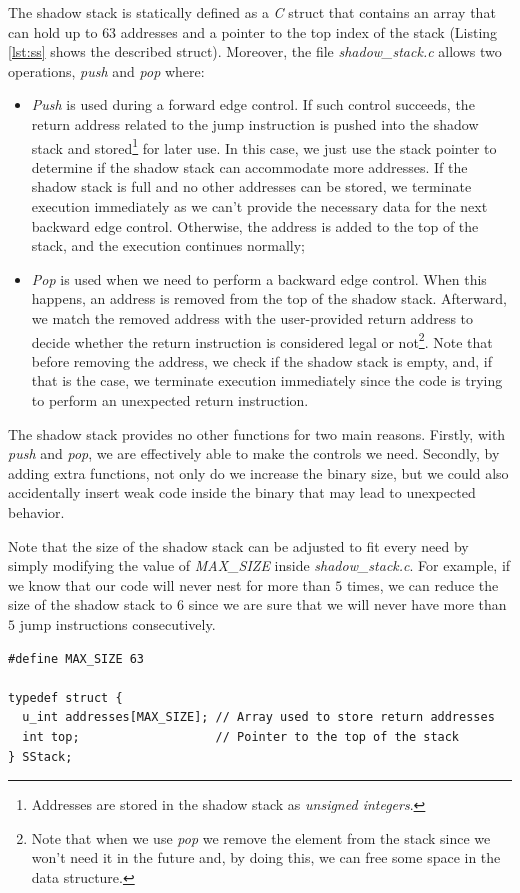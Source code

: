 The shadow stack is statically defined as a \textit{C} struct that contains an array
that can hold up to $63$ addresses and a pointer to the top index of the stack (Listing
\ref{lst:ss} shows the described struct). Moreover, the file \textit{shadow\_stack.c}
allows two operations, \textit{push} and \textit{pop} where:
\begin{itemize}
  \item \textit{Push} is used during a forward edge control. If such control succeeds,
    the return address related to the jump instruction is pushed into the shadow
    stack and stored\footnote{Addresses are stored in the shadow stack as
    \textit{unsigned integers}.} for later use. In this case, we just use the stack
    pointer to determine if the shadow stack can accommodate more addresses. If
    the shadow stack is full and no other addresses can be stored, we terminate execution
    immediately as we can't provide the necessary data for the next backward edge
    control. Otherwise, the address is added to the top of the stack, and the
    execution continues normally;

  \item \textit{Pop} is used when we need to perform a backward edge control. When
    this happens, an address is removed from the top of the shadow stack. Afterward,
    we match the removed address with the user-provided return address to decide
    whether the return instruction is considered legal or not\footnote{Note that
    when we use \textit{pop} we remove the element from the stack since we won't
    need it in the future and, by doing this, we can free some space in the data
    structure.}. Note that before removing the address, we check if the shadow stack
    is empty, and, if that is the case, we terminate execution immediately since
    the code is trying to perform an unexpected return instruction.
\end{itemize}

The shadow stack provides no other functions for two main reasons. Firstly, with
\textit{push} and \textit{pop}, we are effectively able to make the controls we
need. Secondly, by adding extra functions, not only do we increase the binary size,
but we could also accidentally insert weak code inside the binary that may lead
to unexpected behavior.

Note that the size of the shadow stack can be adjusted to fit every need by
simply modifying the value of \textit{MAX\_SIZE} inside \textit{shadow\_stack.c}.
For example, if we know that our code will never nest for more than $5$ times, we
can reduce the size of the shadow stack to $6$ since we are sure that we will never
have more than $5$ jump instructions consecutively. \\
\begin{lstlisting}[style=CStyle, caption = Shadow stack definition inside \textit{shadow\_stack.c}, label={lst:ss}]
#define MAX_SIZE 63

typedef struct {
  u_int addresses[MAX_SIZE]; // Array used to store return addresses
  int top;                   // Pointer to the top of the stack
} SStack;
\end{lstlisting}

